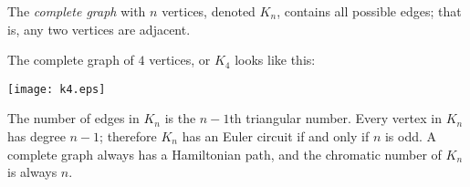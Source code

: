 \documentclass{article}
\begin{document}
The \emph{complete graph} with $n$ vertices, denoted $K_n$, contains all possible edges; that is, any two vertices are adjacent.

The complete graph of $4$ vertices, or $K_4$ looks like this:

\begin{center}
\texttt{[image: k4.eps]}
\end{center}

The number of edges in $K_n$ is the $n-1$th triangular number.  Every vertex in $K_n$ has degree $n-1$; therefore $K_n$ has an Euler circuit if and only if $n$ is odd.  A complete graph always has a Hamiltonian path, and the chromatic number of $K_n$ is always $n$.
\end{document}
